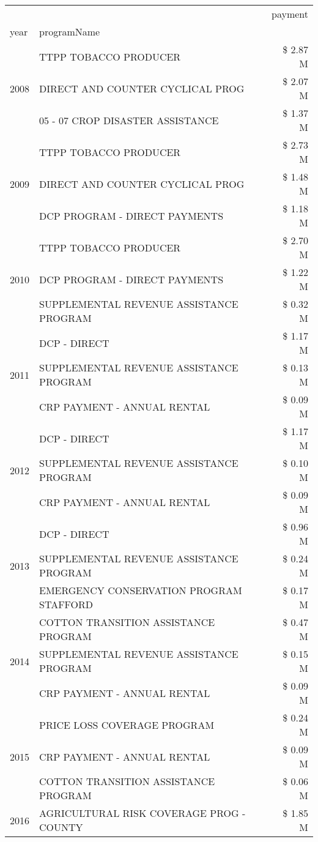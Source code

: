 \begin{tabular}{llr}
\toprule
 &  & payment \\
year & programName &  \\
\midrule
\multirow[t]{3}{*}{2008} & TTPP TOBACCO PRODUCER & \$ 2.87 M \\
 & DIRECT AND COUNTER CYCLICAL PROG & \$ 2.07 M \\
 & 05 - 07 CROP DISASTER ASSISTANCE & \$ 1.37 M \\
\cline{1-3}
\multirow[t]{3}{*}{2009} & TTPP TOBACCO PRODUCER & \$ 2.73 M \\
 & DIRECT AND COUNTER CYCLICAL PROG & \$ 1.48 M \\
 & DCP PROGRAM - DIRECT PAYMENTS & \$ 1.18 M \\
\cline{1-3}
\multirow[t]{3}{*}{2010} & TTPP TOBACCO PRODUCER & \$ 2.70 M \\
 & DCP PROGRAM - DIRECT PAYMENTS & \$ 1.22 M \\
 & SUPPLEMENTAL REVENUE ASSISTANCE PROGRAM & \$ 0.32 M \\
\cline{1-3}
\multirow[t]{3}{*}{2011} & DCP - DIRECT & \$ 1.17 M \\
 & SUPPLEMENTAL REVENUE ASSISTANCE PROGRAM & \$ 0.13 M \\
 & CRP PAYMENT - ANNUAL RENTAL & \$ 0.09 M \\
\cline{1-3}
\multirow[t]{3}{*}{2012} & DCP - DIRECT & \$ 1.17 M \\
 & SUPPLEMENTAL REVENUE ASSISTANCE PROGRAM & \$ 0.10 M \\
 & CRP PAYMENT - ANNUAL RENTAL & \$ 0.09 M \\
\cline{1-3}
\multirow[t]{3}{*}{2013} & DCP - DIRECT & \$ 0.96 M \\
 & SUPPLEMENTAL REVENUE ASSISTANCE PROGRAM & \$ 0.24 M \\
 & EMERGENCY CONSERVATION PROGRAM STAFFORD & \$ 0.17 M \\
\cline{1-3}
\multirow[t]{3}{*}{2014} & COTTON TRANSITION ASSISTANCE PROGRAM & \$ 0.47 M \\
 & SUPPLEMENTAL REVENUE ASSISTANCE PROGRAM & \$ 0.15 M \\
 & CRP PAYMENT - ANNUAL RENTAL & \$ 0.09 M \\
\cline{1-3}
\multirow[t]{3}{*}{2015} & PRICE LOSS COVERAGE PROGRAM & \$ 0.24 M \\
 & CRP PAYMENT - ANNUAL RENTAL & \$ 0.09 M \\
 & COTTON TRANSITION ASSISTANCE PROGRAM & \$ 0.06 M \\
\cline{1-3}
\multirow[t]{3}{*}{2016} & AGRICULTURAL RISK COVERAGE PROG - COUNTY & \$ 1.85 M \\

\end{tabular}
